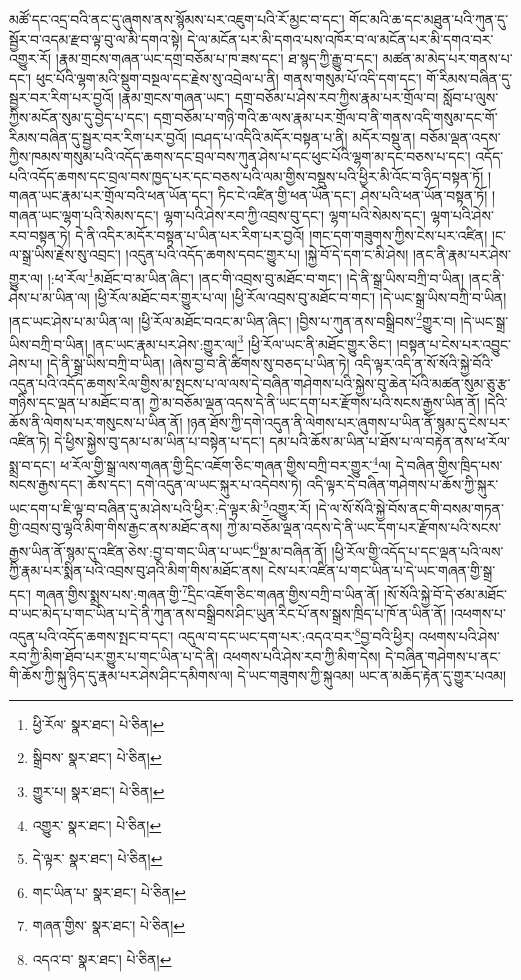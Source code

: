 མཚོ་དང་འདྲ་བའི་ནང་དུ་ཞུགས་ནས་སྙོམས་པར་འཇུག་པའི་རོ་མྱང་བ་དང་། གོང་མའི་ཆ་དང་མཐུན་པའི་ཀུན་དུ་སྦྱོར་བ་འདམ་རྫབ་ལྟ་བུ་ལ་མི་དགའ་སྟེ། དེ་ལ་མངོན་པར་མི་དགའ་པས་འཁོར་བ་ལ་མངོན་པར་མི་དགའ་བར་འགྱུར་རོ། །རྣམ་གྲངས་གཞན་ཡང་དགྲ་བཅོམ་པ་ཁ་ཟས་དང་། ཐ་སྙད་ཀྱི་རྒྱུ་བ་དང་། མཚན་མ་མེད་པར་གནས་པ་དང་། ཕུང་པོའི་ལྷག་མའི་སྡུག་བསྔལ་དང་རྗེས་སུ་འབྲེལ་པ་ནི། གནས་གསུམ་པོ་འདི་དག་དང་། གོ་རིམས་བཞིན་དུ་སྦྱར་བར་རིག་པར་བྱའོ། །རྣམ་གྲངས་གཞན་ཡང་། དགྲ་བཅོམ་པ་ཤེས་རབ་ཀྱིས་རྣམ་པར་གྲོལ་བ། སློབ་པ་ལུས་ཀྱིས་མངོན་སུམ་དུ་བྱེད་པ་དང་། དགྲ་བཅོམ་པ་གཉི་གའི་ཆ་ལས་རྣམ་པར་གྲོལ་བ་ནི་གནས་འདི་གསུམ་དང་གོ་རིམས་བཞིན་དུ་སྦྱར་བར་རིག་པར་བྱའོ། །བཤད་པ་འདིའི་མདོར་བསྟན་པ་ནི། མདོར་བསྡུ་ན། བཅོམ་ལྡན་འདས་ཀྱིས་ཁམས་གསུམ་པའི་འདོད་ཆགས་དང་བྲལ་བས་ཀུན་ཤེས་པ་དང་ཕུང་པོའི་ལྷག་མ་དང་བཅས་པ་དང་། འདོད་པའི་འདོད་ཆགས་དང་བྲལ་བས་ཁྱད་པར་དང་བཅས་པའི་ལམ་གྱིས་བསྡུས་པའི་ཕྱིར་མི་འོང་བ་ཉིད་བསྟན་ཏོ། །གཞན་ཡང་རྣམ་པར་གྲོལ་བའི་ཕན་ཡོན་དང་། ཏིང་ངེ་འཛིན་གྱི་ཕན་ཡོན་དང་། ཤེས་པའི་ཕན་ཡོན་བསྟན་ཏོ། །གཞན་ཡང་ལྷག་པའི་སེམས་དང་། ལྷག་པའི་ཤེས་རབ་ཀྱི་འབྲས་བུ་དང་། ལྷག་པའི་སེམས་དང་། ལྷག་པའི་ཤེས་རབ་བསྟན་ཏེ། དེ་ནི་འདིར་མདོར་བསྟན་པ་ཡིན་པར་རིག་པར་བྱའོ། །གང་དག་གཟུགས་ཀྱིས་ངེས་པར་འཛིན། །ང་ལ་སྒྲ་ཡིས་རྗེས་སུ་འབྲང་། །འདུན་པའི་འདོད་ཆགས་དབང་གྱུར་པ། །སྐྱེ་བོ་དེ་དག་ང་མི་ཤེས། །ནང་ནི་རྣམ་པར་ཤེས་གྱུར་ལ། །:ཕ་རོལ་\footnote{ཕྱི་རོལ་  སྣར་ཐང་།  པེ་ཅིན། }མཐོང་བ་མ་ཡིན་ཞིང་། །ནང་གི་འབྲས་བུ་མཐོང་བ་གང་། །དེ་ནི་སྒྲ་ཡིས་བཀྲི་བ་ཡིན། །ནང་ནི་ཤེས་པ་མ་ཡིན་ལ། །ཕྱི་རོལ་མཐོང་བར་གྱུར་པ་ལ། །ཕྱི་རོལ་འབྲས་བུ་མཐོང་བ་གང་། །དེ་ཡང་སྒྲ་ཡིས་བཀྲི་བ་ཡིན། །ནང་ཡང་ཤེས་པ་མ་ཡིན་ལ། །ཕྱི་རོལ་མཐོང་བའང་མ་ཡིན་ཞིང་། །བྱིས་པ་ཀུན་ནས་བསྒྲིབས་\footnote{སྒྲིབས་  སྣར་ཐང་།  པེ་ཅིན། }གྱུར་བ། །དེ་ཡང་སྒྲ་ཡིས་བཀྲི་བ་ཡིན། །ནང་ཡང་རྣམ་པར་ཤེས་:གྱུར་ལ།\footnote{གྱུར་པ།  སྣར་ཐང་།  པེ་ཅིན། } །ཕྱི་རོལ་ཡང་ནི་མཐོང་གྱུར་ཅིང་། །བསྟན་པ་ངེས་པར་འབྱུང་ཤེས་པ། །དེ་ནི་སྒྲ་ཡིས་བཀྲི་བ་ཡིན། །ཞེས་བྱ་བ་ནི་ཚིགས་སུ་བཅད་པ་ཡིན་ཏེ། འདི་ལྟར་འདི་ན་སོ་སོའི་སྐྱེ་བོའི་འདུན་པའི་འདོད་ཆགས་རིལ་གྱིས་མ་སྤངས་པ་ལ་ལས་དེ་བཞིན་གཤེགས་པའི་སྐྱེས་བུ་ཆེན་པོའི་མཚན་སུམ་ཅུ་རྩ་གཉིས་དང་ལྡན་པ་མཐོང་བ་ན། ཀྱེ་མ་བཅོམ་ལྡན་འདས་དེ་ནི་ཡང་དག་པར་རྫོགས་པའི་སངས་རྒྱས་ཡིན་ནོ། །དེའི་ཆོས་ནི་ལེགས་པར་གསུངས་པ་ཡིན་ནོ། །ཉན་ཐོས་ཀྱི་དགེ་འདུན་ནི་ལེགས་པར་ཞུགས་པ་ཡིན་ནོ་སྙམ་དུ་ངེས་པར་འཛིན་ཏེ། དེ་ཕྱིས་སྐྱེས་བུ་དམ་པ་མ་ཡིན་པ་བསྟེན་པ་དང་། དམ་པའི་ཆོས་མ་ཡིན་པ་ཐོས་པ་ལ་བརྟེན་ནས་ཕ་རོལ་སྨྲ་བ་དང་། ཕ་རོལ་གྱི་སྒྲ་ལས་གཞན་གྱི་དྲིང་འཇོག་ཅིང་གཞན་གྱིས་བཀྲི་བར་གྱུར་\footnote{འགྱུར་  སྣར་ཐང་།  པེ་ཅིན། }ལ། དེ་བཞིན་གྱིས་ཁྲིད་པས་སངས་རྒྱས་དང་། ཆོས་དང་། དགེ་འདུན་ལ་ཡང་སྐུར་པ་འདེབས་ཏེ། འདི་ལྟར་དེ་བཞིན་གཤེགས་པ་ཆོས་ཀྱི་སྐུར་ཡང་དག་པ་ཇི་ལྟ་བ་བཞིན་དུ་མ་ཤེས་པའི་ཕྱིར་:དེ་ལྟར་མི་\footnote{དེ་ལྟར་  སྣར་ཐང་།  པེ་ཅིན། }འགྱུར་རོ། །དེ་ལ་སོ་སོའི་སྐྱེ་བོས་ནང་གི་བསམ་གཏན་གྱི་འབྲས་བུ་ལྷའི་མིག་གིས་རྒྱང་ནས་མཐོང་ནས། ཀྱེ་མ་བཅོམ་ལྡན་འདས་དེ་ནི་ཡང་དག་པར་རྫོགས་པའི་སངས་རྒྱས་ཡིན་ནོ་སྙམ་དུ་འཛིན་ཅེས་:བྱ་བ་གང་ཡིན་པ་ཡང་\footnote{གང་ཡིན་པ་  སྣར་ཐང་།  པེ་ཅིན། }སྔ་མ་བཞིན་ནོ། །ཕྱི་རོལ་གྱི་འདོད་པ་དང་ལྡན་པའི་ལས་ཀྱི་རྣམ་པར་སྨིན་པའི་འབྲས་བུ་ཤའི་མིག་གིས་མཐོང་ནས། ངེས་པར་འཛིན་པ་གང་ཡིན་པ་དེ་ཡང་གཞན་གྱི་སྒྲ་དང་། གཞན་གྱིས་སྨྲས་པས་:གཞན་གྱི་\footnote{གཞན་གྱིས་  སྣར་ཐང་།  པེ་ཅིན། }དྲིང་འཇོག་ཅིང་གཞན་གྱིས་བཀྲི་བ་ཡིན་ནོ། །སོ་སོའི་སྐྱེ་བོ་དེ་ཙམ་མཐོང་བ་ཡང་མེད་པ་གང་ཡིན་པ་དེ་ནི་ཀུན་ནས་བསྒྲིབས་ཤིང་ཡུན་རིང་པོ་ནས་སྒྲས་ཁྲིད་པ་ཁོ་ན་ཡིན་ནོ། །འཕགས་པ་འདུན་པའི་འདོད་ཆགས་སྤང་བ་དང་། འདུལ་བ་དང་ཡང་དག་པར་:འདའ་བར་\footnote{འདའ་བ་  སྣར་ཐང་།  པེ་ཅིན། }བྱ་བའི་ཕྱིར། འཕགས་པའི་ཤེས་རབ་ཀྱི་མིག་ཐོབ་པར་གྱུར་པ་གང་ཡིན་པ་དེ་ནི། འཕགས་པའི་ཤེས་རབ་ཀྱི་མིག་དེས། དེ་བཞིན་གཤེགས་པ་ནང་གི་ཆོས་ཀྱི་སྐུ་ཉིད་དུ་རྣམ་པར་ཤེས་ཤིང་དམིགས་ལ། དེ་ཡང་གཟུགས་ཀྱི་སྐུའམ། ཡང་ན་མཆོད་རྟེན་དུ་གྱུར་པའམ། 